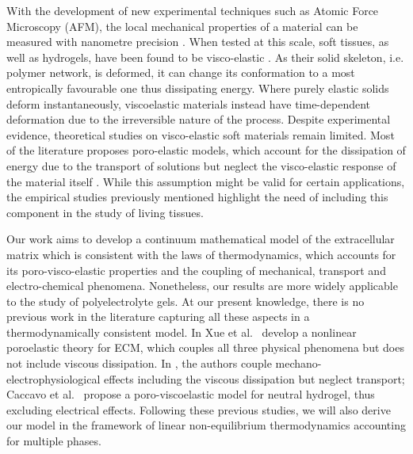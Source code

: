 With the development of new experimental techniques such as Atomic Force Microscopy (AFM), the local mechanical properties of a material can be measured with nanometre precision \cite{viscoporo}. When tested at this scale, soft tissues, as well as hydrogels, have been found to be visco-elastic \cite{ex5}. As their solid skeleton, i.e. polymer network, is deformed, it can change its conformation to a most entropically favourable one thus dissipating energy. Where purely elastic solids deform instantaneously, viscoelastic materials instead have time-dependent deformation due to the irreversible nature of the process. 
Despite experimental evidence, theoretical studies on visco-elastic soft materials remain limited. Most of the literature proposes poro-elastic models, which account for the dissipation of energy due to the transport of solutions but neglect the visco-elastic response of the material itself \cite{Article1}. While this assumption might be valid for certain applications, the empirical studies previously mentioned highlight the need of including this component in the study of living tissues. 

Our work aims to develop a continuum mathematical model of the extracellular matrix which is consistent with the laws of thermodynamics, which accounts for its poro-visco-elastic properties and the coupling of mechanical, transport and electro-chemical phenomena. Nonetheless, our results are more widely applicable to the study of polyelectrolyte gels. At our present knowledge, there is no previous work in the literature capturing all these aspects in a thermodynamically consistent model. In \cite{ecm1,ecm2} Xue et al.~ develop a nonlinear poroelastic theory for ECM, which couples all three physical phenomena but does not include viscous dissipation. In \cite{Jeru}, the authors couple mechano-electrophysiological effects including the viscous dissipation but neglect transport; Caccavo et al.~ \cite{Article1} propose a poro-viscoelastic model for neutral hydrogel, thus excluding electrical effects. Following these previous studies, we will also derive our model in the framework of linear non-equilibrium thermodynamics \cite{NET} accounting for multiple phases.

